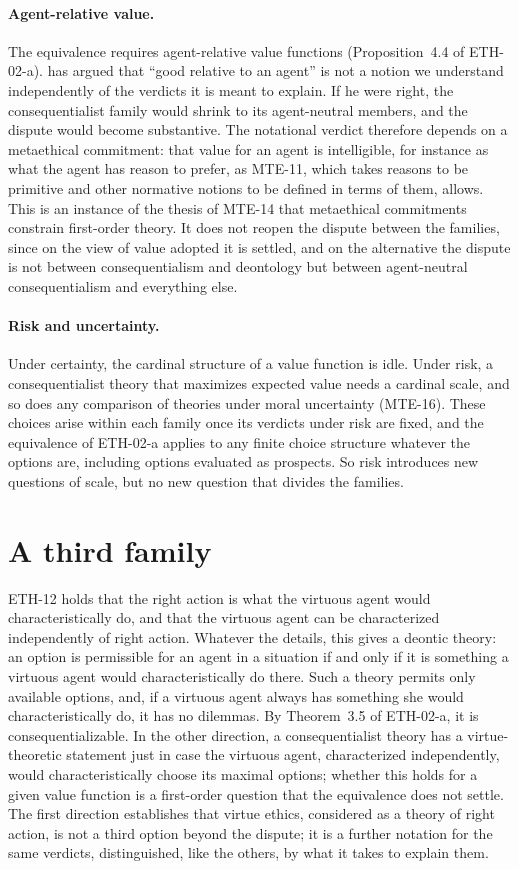 \documentclass{situationist-preprint}
\begin{document}
\paragraph{Agent-relative value.} The equivalence requires agent-relative value functions (Proposition~4.4 of ETH-02-a). \citet{Schroeder2007} has argued that \enquote{good relative to an agent} is not a notion we understand independently of the verdicts it is meant to explain. If he were right, the consequentialist family would shrink to its agent-neutral members, and the dispute would become substantive. The notational verdict therefore depends on a metaethical commitment: that value for an agent is intelligible, for instance as what the agent has reason to prefer, as MTE-11, which takes reasons to be primitive and other normative notions to be defined in terms of them, allows. This is an instance of the thesis of MTE-14 that metaethical commitments constrain first-order theory. It does not reopen the dispute between the families, since on the view of value adopted it is settled, and on the alternative the dispute is not between consequentialism and deontology but between agent-neutral consequentialism and everything else.

\paragraph{Risk and uncertainty.} Under certainty, the cardinal structure of a value function is idle. Under risk, a consequentialist theory that maximizes expected value needs a cardinal scale, and so does any comparison of theories under moral uncertainty (MTE-16). These choices arise within each family once its verdicts under risk are fixed, and the equivalence of ETH-02-a applies to any finite choice structure whatever the options are, including options evaluated as prospects. So risk introduces new questions of scale, but no new question that divides the families.

\section{A third family}

ETH-12 holds that the right action is what the virtuous agent would characteristically do, and that the virtuous agent can be characterized independently of right action. Whatever the details, this gives a deontic theory: an option is permissible for an agent in a situation if and only if it is something a virtuous agent would characteristically do there. Such a theory permits only available options, and, if a virtuous agent always has something she would characteristically do, it has no dilemmas. By Theorem~3.5 of ETH-02-a, it is consequentializable. In the other direction, a consequentialist theory has a virtue-theoretic statement just in case the virtuous agent, characterized independently, would characteristically choose its maximal options; whether this holds for a given value function is a first-order question that the equivalence does not settle. The first direction establishes that virtue ethics, considered as a theory of right action, is not a third option beyond the dispute; it is a further notation for the same verdicts, distinguished, like the others, by what it takes to explain them.
\end{document}
